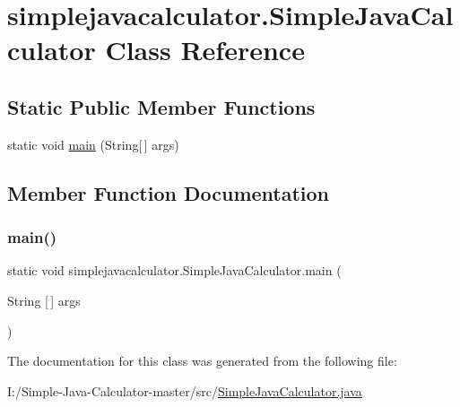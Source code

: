 \hypertarget{classsimplejavacalculator_1_1_simple_java_calculator}{}\section{simplejavacalculator.\+Simple\+Java\+Calculator Class Reference}
\label{classsimplejavacalculator_1_1_simple_java_calculator}
\subsection*{Static Public Member Functions}
\begin{DoxyCompactItemize}
\item 
static void \mbox{\hyperlink{classsimplejavacalculator_1_1_simple_java_calculator_aa23001cc0006f82aa3786227b85b0363}{main}} (String\mbox{[}$\,$\mbox{]} args)
\end{DoxyCompactItemize}


\subsection{Member Function Documentation}
\mbox{\label{classsimplejavacalculator_1_1_simple_java_calculator_aa23001cc0006f82aa3786227b85b0363}} 
\subsubsection{\texorpdfstring{main()}{main()}}
{\footnotesize\ttfamily static void simplejavacalculator.\+Simple\+Java\+Calculator.\+main (\begin{DoxyParamCaption}\item[{String \mbox{[}$\,$\mbox{]}}]{args }\end{DoxyParamCaption})\hspace{0.3cm}{\ttfamily [static]}}



The documentation for this class was generated from the following file\+:\begin{DoxyCompactItemize}
\item 
I\+:/\+Simple-\/\+Java-\/\+Calculator-\/master/src/\mbox{\hyperlink{_simple_java_calculator_8java}{Simple\+Java\+Calculator.\+java}}\end{DoxyCompactItemize}
